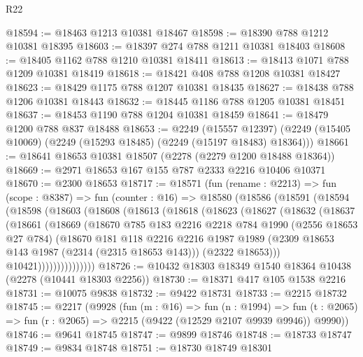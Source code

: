 \begin{lexlean}{R22}
\begin{coremodule}
@18594 := @18463 @1213 @10381 @18467
@18598 := @18390 @788 @1212 @10381 @18395
@18603 := @18397 @274 @788 @1211 @10381 @18403
@18608 := @18405 @1162 @788 @1210 @10381 @18411
@18613 := @18413 @1071 @788 @1209 @10381 @18419
@18618 := @18421 @408 @788 @1208 @10381 @18427
@18623 := @18429 @1175 @788 @1207 @10381 @18435
@18627 := @18438 @788 @1206 @10381 @18443
@18632 := @18445 @1186 @788 @1205 @10381 @18451
@18637 := @18453 @1190 @788 @1204 @10381 @18459
@18641 := @18479 @1200 @788 @837 @18488
@18653 := @2249
    (@15557 @12397)
    (@2249 (@15405 @10069) (@2249 (@15293 @18485) (@2249 (@15197 @18483) @18364)))
@18661 := @18641 @18653 @10381 @18507 (@2278 (@2279 @1200 @18488 @18364))
@18669 := @2971 @18653 @167 @155 @787 @2333 @2216 @10406 @10371
@18670 := @2300 @18653
@18717 := @18571
    (fun (rename : @2213) =>
    fun (scope : @8387) =>
    fun (counter : @16) =>
    @18580
      (@18586
        (@18591
          (@18594
            (@18598
              (@18603
                (@18608
                  (@18613
                    (@18618
                      (@18623
                        (@18627
                          (@18632
                            (@18637
                              (@18661
                                (@18669
                                  (@18670
                                    @785
                                    @183
                                    @2216
                                    @2218
                                    @784
                                    @1990
                                    (@2556 @18653 @27 @784)
                                    (@18670
                                      @181
                                      @118
                                      @2216
                                      @2216
                                      @1987
                                      @1989
                                      (@2309 @18653 @143 @1987 (@2314 (@2315 @18653 @143)))
                                      (@2322 @18653)))
                                  @10421)))))))))))))))
@18726 := @10432 @18303 @18349 @1540 @18364 @10438 (@2278 (@10441 @18303 @2256))
@18730 := @18371 @417 @105 @1538 @2216
@18731 := @10075 @9838
@18732 := @9422 @18731
@18733 := @2215 @18732
@18745 := @2217
    (@9928
      (fun (m : @16) =>
      fun (n : @1994) =>
      fun (t : @2065) => fun (r : @2065) => @2215 (@9422 (@12529 @2107 @9939 @9946)) @9990))
@18746 := @9641 @18745
@18747 := @9899 @18746
@18748 := @18733 @18747
@18749 := @9834 @18748
@18751 := @18730 @18749 @18301

\end{coremodule}
\end{lexlean}

